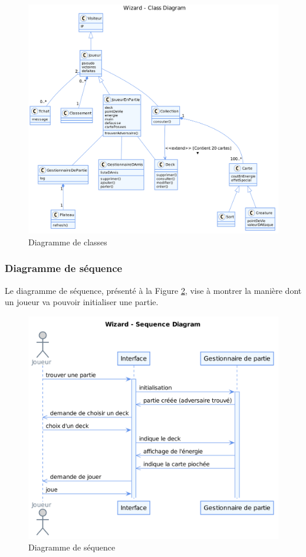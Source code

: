\documentclass[11pt,a4paper]{article}
\begin{document}
\begin{figure}[ht]
  \centering
  \includegraphics[width=1\textwidth]{../uml_files/ClassDiagram.png}
  \caption{\label{fig:class} Diagramme de classes}
\end{figure}

\subsubsection{Diagramme de séquence}

Le diagramme de séquence, présenté à la Figure \ref{fig:seq}, vise à montrer la manière dont un joueur va
pouvoir initialiser une partie.

\begin{figure}[ht]
  \centering
  \includegraphics[width=1\textwidth]{../uml_files/SequenceDiagram.png}
  \caption{\label{fig:seq} Diagramme de séquence}
\end{figure}
\end{document}

